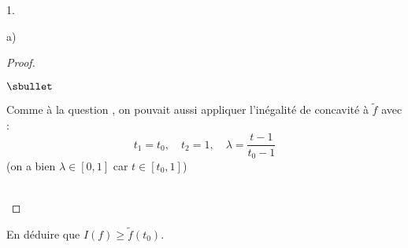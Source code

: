 \begin{noliste}{1.}
\begin{noliste}{a)}
\begin{proof}
\begin{noliste}{$\sbullet$}
     \end{noliste}
    
    
    
    
    \newpage
    
    
    
    
    \begin{remark}
      Comme à la question , on pouvait aussi appliquer 
      l'inégalité de concavité à $\tilde{f}$ avec :
      \[
        t_1 = t_0, \quad t_2 = 1, \quad \lambda = \dfrac{t-1}{t_0-1}
      \]
      (on a bien $\lambda \in [0,1]$ car $t\in [t_0,1]$)
    \end{remark}~\\[-1.4cm]
  \end{proof}
  
  \item En déduire que $I(f) \geq \tilde{f}(t_0)$. 
  

\end{noliste}
\end{noliste}
